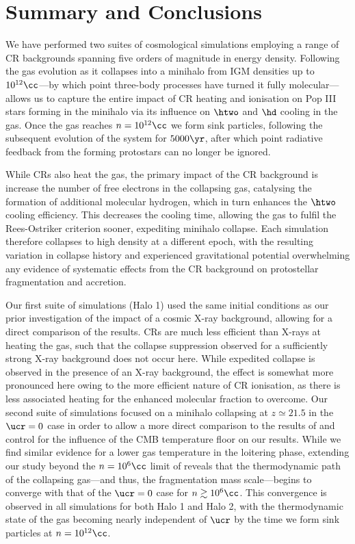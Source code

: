 \section{Summary and Conclusions}
\label{conclusions}

We have performed two suites of cosmological simulations employing a range of CR backgrounds spanning five orders of magnitude in energy density. 
Following the gas evolution as it collapses into a minihalo from IGM densities up to $10^{12}\cc$---by which point three-body processes have turned it fully molecular---allows us to capture the entire impact of CR heating and ionisation on Pop III stars forming in the minihalo via its influence on $\htwo$ and $\hd$ cooling in the gas.
Once the gas reaches $n=10^{12}\cc$ we form sink particles, following the subsequent evolution of the system for $5000\yr$, after which point radiative feedback from the forming protostars can no longer be ignored.

While CRs also heat the gas, the primary impact of the CR background is increase the number  of free electrons in the collapsing gas, catalysing the formation of additional molecular hydrogen, which in turn enhances the $\htwo$ cooling efficiency.  
This decreases the cooling time, allowing the gas to fulfil the Rees-Ostriker criterion sooner, expediting minihalo collapse. 
Each simulation therefore collapses to high density at a different epoch, with the resulting variation in collapse history and experienced gravitational potential overwhelming any evidence of systematic effects from the CR background on protostellar fragmentation and accretion.

Our first suite of simulations (Halo 1) used the same initial conditions as our prior investigation of the impact of a cosmic X-ray background, allowing for a direct comparison of the results.
CRs are much less efficient than X-rays at heating the gas, such that the collapse suppression observed for a sufficiently strong X-ray background does not occur here.  
While expedited collapse is observed in the presence of an X-ray background, the effect is somewhat more pronounced here owing to the more efficient nature of CR ionisation, as there is less associated heating for the enhanced molecular fraction to overcome.
Our second suite of simulations focused on a minihalo collapsing at $z\simeq21.5$ in the $\ucr=0$ case in order to allow a more direct comparison to the results of \citet{StacyBromm2007} and control for the influence of the CMB temperature floor on our results.
While we find similar evidence for a lower gas temperature in the loitering phase, extending our study beyond the $n=10^6\cc$ limit of \citet{StacyBromm2007} reveals that the thermodynamic path of the collapsing gas---and thus, the fragmentation mass scale---begins to converge with that of the $\ucr=0$ case for $n\gtrsim10^6\cc$.  
This convergence is observed in all simulations for both Halo 1 and Halo 2, with the thermodynamic state of the gas becoming nearly independent of $\ucr$ by the time we form sink particles at $n=10^{12}\cc$.

